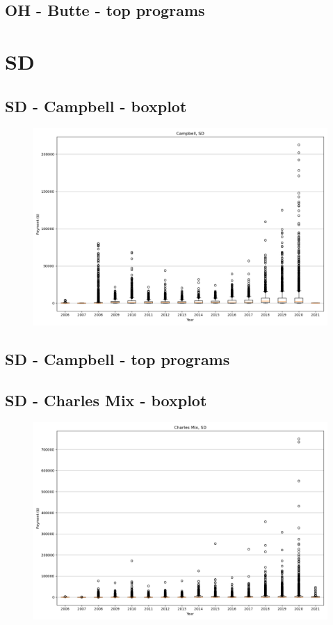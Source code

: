 \subsection*{OH - Butte - top programs}

\newpage
\section*{SD}
\subsection*{SD - Campbell - boxplot}
\begin{figure}[h]
\centering
\includegraphics[width=7in]{../output/boxplots/counties/Campbell-SD_boxplot.png}
\end{figure}


\subsection*{SD - Campbell - top programs}

\newpage
\subsection*{SD - Charles Mix - boxplot}
\begin{figure}[h]
\centering
\includegraphics[width=7in]{../output/boxplots/counties/Charles Mix-SD_boxplot.png}
\end{figure}



